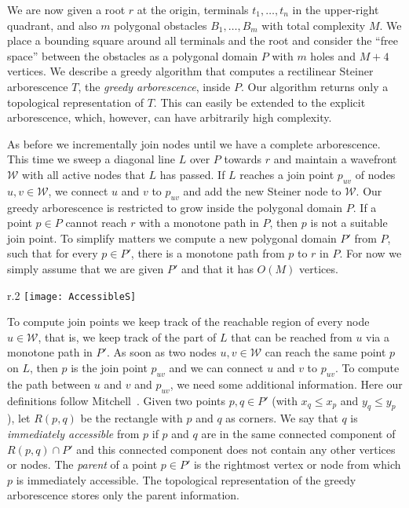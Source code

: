 \documentclass{journalA4}
\begin{document}
We are now given a root $r$ at the origin, terminals $t_1, \ldots, t_n$ in the upper-right quadrant, and also $m$ polygonal obstacles $B_1, \ldots, B_m$ with total complexity $M$. We place a bounding square around all terminals and the root and consider the ``free space'' between the obstacles as a polygonal domain $P$ with $m$ holes and $M+4$ vertices. We describe a greedy algorithm that computes a rectilinear Steiner arborescence $T$, the \emph{greedy arborescence}, inside $P$. Our algorithm returns only a topological representation of $T$. This can easily be extended to the explicit arborescence, which, however, can have arbitrarily high complexity.

As before we incrementally join nodes until we have a complete arborescence. This time we sweep a diagonal line $L$ over $P$ towards $r$ and maintain a wavefront $\mathcal{W}$ with all active nodes that $L$ has passed. If $L$ reaches a join point $p_{uv}$ of nodes $u, v \in \mathcal{W}$, we connect $u$ and $v$ to $p_{uv}$ and add the new Steiner node to $\mathcal{W}$. Our greedy arborescence is restricted to grow inside the polygonal domain $P$. If a point $p \in P$ cannot reach $r$ with a monotone path in $P$, then $p$ is not a suitable join point. To simplify matters we compute a new polygonal domain $P'$ from $P$, such that for every $p \in P'$, there is a monotone path from $p$ to $r$ in $P$. For now we simply assume that we are given $P'$ and that it has $O(M)$ vertices.

\begin{wrapfigure}[6]{r}{.2\textwidth}
  \centering
  \texttt{[image: AccessibleS]}
\end{wrapfigure}
To compute join points we keep track of the reachable region of every node $u \in \mathcal{W}$, that is, we keep track of the part of $L$ that can be reached from $u$ via a monotone path in $P'$. As soon as two nodes $u, v \in \mathcal{W}$ can reach the same point $p$ on $L$, then $p$ is the join point $p_{uv}$ and we can connect $u$ and $v$ to $p_{uv}$. To compute the path between $u$ and $v$ and $p_{uv}$, we need some additional information. Here our definitions follow Mitchell~\cite{Mitchell92}. Given two points $p, q \in P'$ (with $x_q \leq x_p$
and $y_q \leq y_p$), let $R(p, q)$ be the rectangle with $p$ and $q$ as corners. We say that $q$ is \emph{immediately accessible} from $p$ if $p$
and $q$ are in the same connected component of $R(p, q) \cap P'$ and this connected component does not
contain any other vertices or nodes. The \emph{parent} of a point $p \in P'$
is the rightmost vertex or node from which $p$ is immediately accessible.
The topological representation of the greedy arborescence stores only the parent information.
\end{document}
